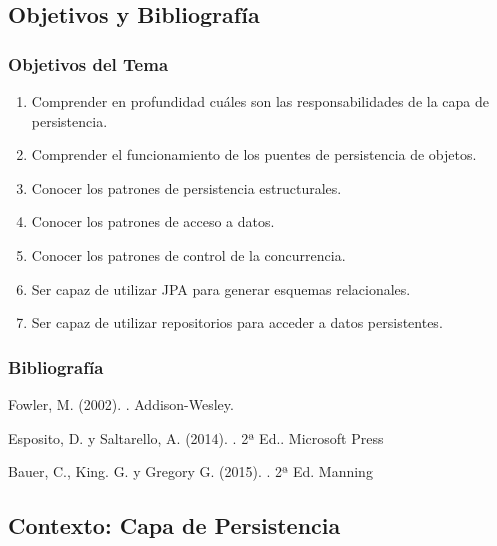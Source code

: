 \documentclass[a4paper,slidestop,xcolor=pst,blue]{beamer}
\begin{document}
\subsection{Objetivos y Bibliografía}

\begin{frame}[c]
    \frametitle{Objetivos del Tema}
    \begin{enumerate}[<+->]
         \item Comprender en profundidad cuáles son las responsabilidades de la capa de persistencia.
         \item Comprender el funcionamiento de los puentes de persistencia de objetos.
         \item Conocer los patrones de persistencia estructurales.
         \item Conocer los patrones de acceso a datos.
         \item Conocer los patrones de control de la concurrencia.
         \item Ser capaz de utilizar JPA para generar esquemas relacionales.
         \item Ser capaz de utilizar repositorios para acceder a datos persistentes.
    \end{enumerate}
\end{frame}

\begin{frame}[c]
    \frametitle{Bibliografía}
    \begin{thebibliography}{1}

        Fowler, M. (2002).
        .
        \newblock Addison-Wesley.

        Esposito, D. y Saltarello, A. (2014).
        . 2ª Ed..
        \newblock Microsoft Press

        Bauer, C., King. G. y Gregory G. (2015).
        . 2ª Ed.
        \newblock Manning



    \end{thebibliography}
\end{frame}

\subsection{Contexto: Capa de Persistencia}
\end{document}
